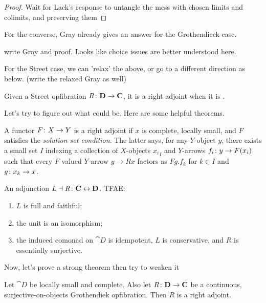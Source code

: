 \begin{proof}
{\chris Wait for Lack's response to untangle the mess with chosen limits and colimits, and preserving them}
\end{proof}

For the converse, Gray already gives an answer for the Grothendieck case.

\begin{thm}
 {\chris write Gray and proof. Looks like choice issues are better understood here.}
\end{thm}

For the Street case, we can 'relax' the above, or go to a different direction as below. {(\chris write the relaxed Gray as well)}

\begin{thm}
	Given a Street opfibration $ R \colon \mathbf{D} \to \mathbf{C} $, it is a right adjoint when it is \nice.
\end{thm}
 
Let's try to figure out what \nice could be. Here are some helpful theorems.

\begin{thm}
\label{thm:GAFT}
	A functor $ F \colon X \to Y $ is a right adjoint if  $ x $ is complete, locally small, and $ F $ satisfies the \emph{solution set condition}. The latter says, for any $ Y $-object $ y $, there exists a small set $ I $ indexing a collection of $ X $-objects $ {x_i}_I $ and $ Y $-arrows $ {f_i \colon y \to F ( x_i ) } $ such that every $ F $-valued $ Y $-arrow $ y \to R x $ factors as $ Fg . f_k $ for $ k \in I $ and $ g \colon x_k \to x $.
\end{thm}

\begin{thm}
\label{thm:GabZis}
	An adjunction $ L \dashv R \colon \mathbf{C} \leftrightarrow \mathbf{D} $. TFAE:
	\begin{enumerate}
		\item $ L $ is full and faithful;
		\item the unit is an isomorphism;
		\item the induced comonad on $ \cat{D} $ is idempotent, $ L $ is conservative, and $ R $ is essentially surjective.
	\end{enumerate}
\end{thm}

Now, let's prove a strong theorem then try to weaken it

\begin{thm}
	Let $ \cat{D}$ be locally small and complete. Also let $ R \colon \mathbf{D} \to \mathbf{C} $ be a continuous, surjective-on-objects Grothendiek opfibration.  Then $ R $ is a right adjoint.
\end{thm}

